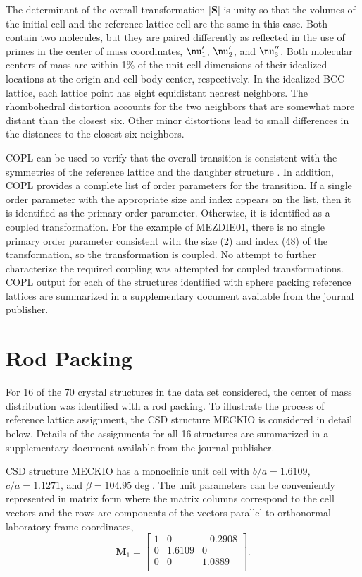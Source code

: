 \documentclass{iucr}              %
\begin{document}
The determinant of the overall transformation $|\mathbf{S}|$ is unity so that the volumes of the initial cell and the reference lattice cell are the same in this case.  Both contain two molecules, but they are paired differently as reflected in the use of primes in the center of mass coordinates, 
$\mbox{\boldmath$\nu$}_{1}^{\prime}$, 
$\mbox{\boldmath$\nu$}_{2}^{\prime}$, and
$\mbox{\boldmath$\nu$}_{3}^{\prime\prime}$.
Both molecular centers of mass are within 1\% of the unit cell dimensions of their idealized locations at the origin and cell body center, respectively.  In the idealized BCC lattice, each lattice point has eight equidistant nearest neighbors.  The rhombohedral distortion accounts for the two neighbors that are somewhat more distant than the closest six.  Other minor distortions lead to small differences in the distances to the closest six neighbors.

COPL can be used to verify that the overall transition is consistent with the symmetries of the reference lattice and the daughter structure \cite{Stokes01}.  In addition, COPL provides a complete list of order parameters for the transition.  If a single order parameter with the appropriate size and index appears on the list, then it is identified as the primary order parameter.  Otherwise, it is identified as a coupled transformation.  For the example of MEZDIE01, there is no single primary order parameter consistent with the size (2) and index (48) of the transformation, so the transformation is coupled.  No attempt to further characterize the required coupling was attempted for coupled transformations.  COPL output for each of the structures identified with sphere packing reference lattices are summarized in a supplementary document available from the journal publisher.


\section{Rod Packing}

For 16 of the 70 crystal structures in the data set considered, the center of mass distribution was identified with a rod packing.  To illustrate the process of reference lattice assignment, the CSD structure MECKIO is considered in detail below.  Details of the assignments for all 16 structures are summarized in a supplementary document available from the journal publisher.

CSD structure MECKIO has a monoclinic unit cell with $b/a=1.6109$, $c/a=1.1271$, and $\beta=104.95\deg$.  The unit parameters can be conveniently represented in matrix form where the matrix columns correspond to the cell vectors and the rows are components of the vectors parallel to orthonormal laboratory frame coordinates,
\begin{equation}
   \mathbf{M}_1=\left[
     \begin{array}{ccc}
        1& 0& -0.2908\\
        0& 1.6109& 0\\
        0& 0& 1.0889\\
     \end{array}
  \right].
\end{equation}
\end{document}

